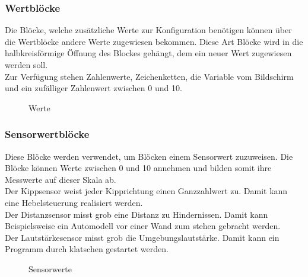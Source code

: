 \subsubsection{Wertblöcke}

Die Blöcke, welche zusätzliche Werte zur Konfiguration benötigen können über die Wertblöcke andere Werte zugewiesen bekommen. Diese Art Blöcke wird in die halbkreisförmige Öffnung des Blockes gehängt, dem ein neuer Wert zugewiesen werden soll. \\
Zur Verfügung stehen Zahlenwerte, Zeichenketten, die Variable vom Bildschirm und ein zufälliger Zahlenwert zwischen 0 und 10.

\begin{figure}[htbp!]
	\centering
	\caption[Werte]{Werte}
	\label{img:Werte}
\end{figure}


\subsubsection{Sensorwertblöcke}

Diese Blöcke werden verwendet, um Blöcken einem Sensorwert zuzuweisen. Die Blöcke können Werte zwischen 0 und 10 annehmen und bilden somit ihre Messwerte auf dieser Skala ab.\\
Der Kippsensor weist jeder Kipprichtung einen Ganzzahlwert zu. Damit kann eine Hebelsteuerung realisiert werden. \\
Der Distanzsensor misst grob eine Distanz zu Hindernissen. Damit kann Beispielsweise ein Automodell vor einer Wand zum stehen gebracht werden.\\
Der Lautstärkesensor misst grob die Umgebungslautstärke. Damit kann ein Programm durch klatschen gestartet werden.

\begin{figure}[htbp!]
	\centering
	\caption[Sensorwerte]{Sensorwerte} %
	\label{img:Sensorwerte}
\end{figure}


